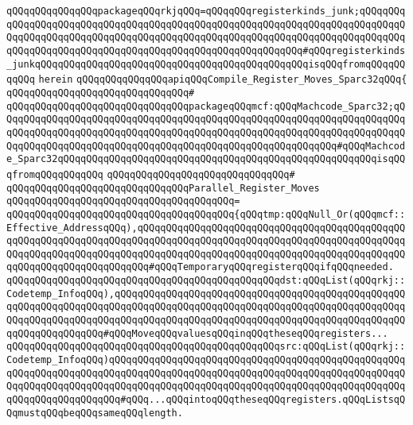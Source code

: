 \verb|qQQqqQQqqQQqqQQqpackageqQQqrkjqQQq=qQQqqQQqregisterkinds_junk;qQQqqQQqqQQqqQQqqQQqqQQqqQQqqQQqqQQqqQQqqQQqqQQqqQQqqQQqqQQqqQQqqQQqqQQqqQQqqQQqqQQqqQQqqQQqqQQqqQQqqQQqqQQqqQQqqQQqqQQqqQQqqQQqqQQqqQQqqQQqqQQqqQQqqQQqqQQqqQQqqQQqqQQqqQQqqQQqqQQqqQQqqQQqqQQqqQQqqQQq#qQQqregisterkinds_junkqQQqqQQqqQQqqQQqqQQqqQQqqQQqqQQqqQQqqQQqqQQqqQQqisqQQqfromqQQqqQQqqQQq|\newline
\verb|herein|\newline
\newline
\verb|qQQqqQQqqQQqqQQqapiqQQqCompile_Register_Moves_Sparc32qQQq{|\newline
\verb|qQQqqQQqqQQqqQQqqQQqqQQqqQQqqQQq#|\newline
\verb|qQQqqQQqqQQqqQQqqQQqqQQqqQQqqQQqpackageqQQqmcf:qQQqMachcode_Sparc32;qQQqqQQqqQQqqQQqqQQqqQQqqQQqqQQqqQQqqQQqqQQqqQQqqQQqqQQqqQQqqQQqqQQqqQQqqQQqqQQqqQQqqQQqqQQqqQQqqQQqqQQqqQQqqQQqqQQqqQQqqQQqqQQqqQQqqQQqqQQqqQQqqQQqqQQqqQQqqQQqqQQqqQQqqQQqqQQqqQQqqQQqqQQqqQQqqQQqqQQq#qQQqMachcode_Sparc32qQQqqQQqqQQqqQQqqQQqqQQqqQQqqQQqqQQqqQQqqQQqqQQqqQQqqQQqisqQQqfromqQQqqQQqqQQq|\newline
\verb|qQQqqQQqqQQqqQQqqQQqqQQqqQQqqQQq#|\newline
\verb|qQQqqQQqqQQqqQQqqQQqqQQqqQQqqQQqParallel_Register_Moves|\newline
\verb|qQQqqQQqqQQqqQQqqQQqqQQqqQQqqQQqqQQqqQQq=|\newline
\verb|qQQqqQQqqQQqqQQqqQQqqQQqqQQqqQQqqQQqqQQq{qQQqtmp:qQQqNull_Or(qQQqmcf::Effective_AddressqQQq),qQQqqQQqqQQqqQQqqQQqqQQqqQQqqQQqqQQqqQQqqQQqqQQqqQQqqQQqqQQqqQQqqQQqqQQqqQQqqQQqqQQqqQQqqQQqqQQqqQQqqQQqqQQqqQQqqQQqqQQqqQQqqQQqqQQqqQQqqQQqqQQqqQQqqQQqqQQqqQQqqQQqqQQqqQQqqQQqqQQqqQQqqQQqqQQqqQQqqQQqqQQqqQQqqQQq#qQQqTemporaryqQQqregisterqQQqifqQQqneeded.|\newline
\verb|qQQqqQQqqQQqqQQqqQQqqQQqqQQqqQQqqQQqqQQqqQQqqQQqdst:qQQqList(qQQqrkj::Codetemp_InfoqQQq),qQQqqQQqqQQqqQQqqQQqqQQqqQQqqQQqqQQqqQQqqQQqqQQqqQQqqQQqqQQqqQQqqQQqqQQqqQQqqQQqqQQqqQQqqQQqqQQqqQQqqQQqqQQqqQQqqQQqqQQqqQQqqQQqqQQqqQQqqQQqqQQqqQQqqQQqqQQqqQQqqQQqqQQqqQQqqQQqqQQqqQQqqQQqqQQqqQQqqQQqqQQqqQQq#qQQqMoveqQQqvaluesqQQqinqQQqtheseqQQqregisters...|\newline
\verb|qQQqqQQqqQQqqQQqqQQqqQQqqQQqqQQqqQQqqQQqqQQqqQQqsrc:qQQqList(qQQqrkj::Codetemp_InfoqQQq)qQQqqQQqqQQqqQQqqQQqqQQqqQQqqQQqqQQqqQQqqQQqqQQqqQQqqQQqqQQqqQQqqQQqqQQqqQQqqQQqqQQqqQQqqQQqqQQqqQQqqQQqqQQqqQQqqQQqqQQqqQQqqQQqqQQqqQQqqQQqqQQqqQQqqQQqqQQqqQQqqQQqqQQqqQQqqQQqqQQqqQQqqQQqqQQqqQQqqQQqqQQqqQQqqQQq#qQQq...qQQqintoqQQqtheseqQQqregisters.qQQqListsqQQqmustqQQqbeqQQqsameqQQqlength.|\newline
